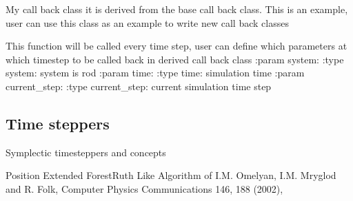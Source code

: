 \documentclass[letterpaper,10pt,english]{sphinxmanual}
\begin{document}
\begin{fulllineitems}
\label{\detokenize{documentation:elastica.callback_functions.MyCallBack}}
My call back class it is derived from the base call back class.
This is an example, user can use this class as an example to write
new call back classes

\begin{fulllineitems}
\label{\detokenize{documentation:elastica.callback_functions.MyCallBack.make_callback}}
This function will be called every time step, user can
define which parameters at which time\sphinxhyphen{}step to be called back
in derived call back class
:param system:
:type system: system is rod
:param time:
:type time: simulation time
:param current\_step:
:type current\_step: current simulation time step

\end{fulllineitems}


\end{fulllineitems}



\subsection{Time steppers}
\label{\detokenize{documentation:module-elastica.timestepper.symplectic_steppers}}\label{\detokenize{documentation:time-steppers}}
Symplectic timesteppers and concepts

\begin{fulllineitems}
\label{\detokenize{documentation:elastica.timestepper.symplectic_steppers.PEFRL}}
Position Extended Forest\sphinxhyphen{}Ruth Like Algorithm of
I.M. Omelyan, I.M. Mryglod and R. Folk, Computer Physics Communications 146, 188 (2002),

\end{fulllineitems}
\end{document}
